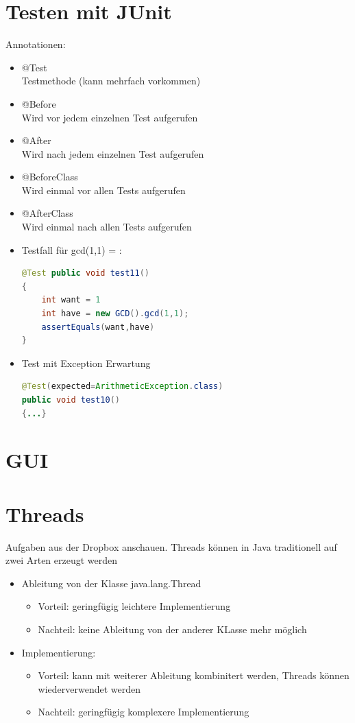 \section{Testen mit JUnit}
Annotationen:
\begin{itemize}
\item @Test\\Testmethode (kann mehrfach vorkommen)
\item @Before \\ Wird vor jedem einzelnen Test aufgerufen
\item @After \\ Wird nach jedem einzelnen Test aufgerufen
\item @BeforeClass \\ Wird einmal vor allen Tests aufgerufen
\item @AfterClass \\ Wird einmal nach allen Tests aufgerufen
\item Testfall für gcd(1,1) = :\\
\begin{lstlisting}[language=JAVA]
@Test public void test11()
{
	int want = 1
	int have = new GCD().gcd(1,1);
	assertEquals(want,have)
}
\end{lstlisting}
\item Test mit Exception Erwartung \\
\begin{lstlisting}[language=JAVA]
@Test(expected=ArithmeticException.class)
public void test10()
{...}
\end{lstlisting}
\end{itemize}
%
%
%
\section{GUI}

\section{Threads}
Aufgaben aus der Dropbox anschauen.
Threads können in Java traditionell auf zwei Arten erzeugt werden
\begin{itemize}
	\item Ableitung von der Klasse java.lang.Thread
	\begin{itemize}
	\item Vorteil: geringfügig leichtere Implementierung 
	\item Nachteil: keine Ableitung von der anderer KLasse mehr möglich
	\end{itemize}
	\item Implementierung:
	\begin{itemize}
	\item Vorteil: kann mit weiterer Ableitung kombinitert werden, Threads können wiederverwendet werden
	\item Nachteil: geringfügig komplexere Implementierung
	\end{itemize}
\end{itemize}